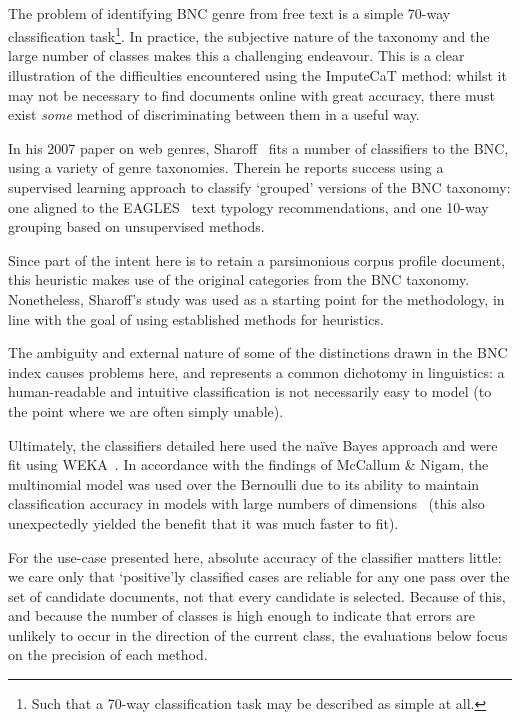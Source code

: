 
\paragraph{}
The problem of identifying BNC genre from free text is a simple 70-way classification task\footnote{Such that a 70-way classification task may be described as simple at all.}.  In practice, the subjective nature of the taxonomy and the large number of classes makes this a challenging endeavour.  This is a clear illustration of the difficulties encountered using the ImputeCaT method: whilst it may not be necessary to find documents online with great accuracy, there must exist \textsl{some} method of discriminating between them in a useful way.



In his 2007 paper on web genres, Sharoff~\cite[p. 5]{sharoff2007classifying} fits a number of classifiers to the BNC, using a variety of genre taxonomies.  Therein he reports success using a supervised learning approach to classify `grouped' versions of the BNC taxonomy: one aligned to the EAGLES~\cite{EagTcwgCtypeaglespreliminary} text typology recommendations, and one 10-way grouping based on unsupervised methods.

Since part of the intent here is to retain a parsimonious corpus profile document, this heuristic makes use of the original categories from the BNC taxonomy.  Nonetheless, Sharoff's study was used as a starting point for the methodology, in line with the goal of using established methods for heuristics.

The ambiguity and external nature of some of the distinctions drawn in the BNC index causes problems here, and represents a common dichotomy in linguistics: a human-readable and intuitive classification is not necessarily easy to model (to the point where we are often simply unable).

Ultimately, the classifiers detailed here used the na\"ive Bayes approach and were fit using WEKA~\cite{hall2009weka}.  In accordance with the findings of McCallum \& Nigam, the multinomial model was used over the Bernoulli due to its ability to maintain classification accuracy in models with large numbers of dimensions~\cite{mccallum1998comparison} (this also unexpectedly yielded the benefit that it was much faster to fit).

For the use-case presented here, absolute accuracy of the classifier matters little: we care only that `positive'ly classified cases are reliable for any one pass over the set of candidate documents, not that every candidate is selected.  Because of this, and because the number of classes is high enough to indicate that errors are unlikely to occur in the direction of the current class, the evaluations below focus on the precision of each method.


